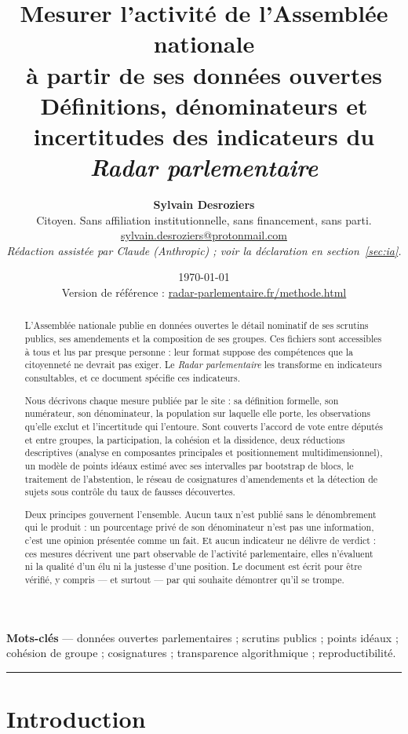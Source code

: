 \documentclass[11pt,a4paper]{article}
\title{\vspace{-1.2cm}
Mesurer l'activité de l'Assemblée nationale\\à partir de ses données ouvertes\\[0.35em]
\large Définitions, dénominateurs et incertitudes des indicateurs du
\emph{Radar parlementaire}}
\author{%
  \normalsize\textbf{Sylvain Desroziers}\\[0.15em]
  \small Citoyen. Sans affiliation institutionnelle, sans financement, sans parti.\\
  \small\href{mailto:sylvain.desroziers@protonmail.com}
             {sylvain.desroziers@protonmail.com}\\[0.5em]
  \small\itshape Rédaction assistée par Claude (Anthropic) ;
  voir la déclaration en section~\ref{sec:ia}.
}
\date{\small\today\\[0.3em]
  \small Version de référence : \href{https://radar-parlementaire.fr/methode.html}
                                     {radar-parlementaire.fr/methode.html}}
\begin{document}
\maketitle
\thispagestyle{plain}

\begin{abstract}
\noindent
L'Assemblée nationale publie en données ouvertes le détail nominatif de ses
scrutins publics, ses amendements et la composition de ses groupes. Ces
fichiers sont accessibles à tous et lus par presque personne : leur format
suppose des compétences que la citoyenneté ne devrait pas exiger. Le
\emph{Radar parlementaire} les transforme en indicateurs consultables, et ce
document spécifie ces indicateurs.

Nous décrivons chaque mesure publiée par le site : sa définition formelle, son
numérateur, son dénominateur, la population sur laquelle elle porte, les
observations qu'elle exclut et l'incertitude qui l'entoure. Sont couverts
l'accord de vote entre députés et entre groupes, la participation, la cohésion
et la dissidence, deux réductions descriptives (analyse en composantes
principales et positionnement multidimensionnel), un modèle de points idéaux
estimé avec ses intervalles par bootstrap de blocs, le traitement de
l'abstention, le réseau de cosignatures d'amendements et la détection de
sujets sous contrôle du taux de fausses découvertes.

Deux principes gouvernent l'ensemble. Aucun taux n'est publié sans le
dénombrement qui le produit : un pourcentage privé de son dénominateur n'est
pas une information, c'est une opinion présentée comme un fait. Et aucun
indicateur ne délivre de verdict : ces mesures décrivent une part observable
de l'activité parlementaire, elles n'évaluent ni la qualité d'un élu ni la
justesse d'une position. Le document est écrit pour être vérifié, y compris —
et surtout — par qui souhaite démontrer qu'il se trompe.
\end{abstract}

\vspace{0.4em}
\noindent\small\textbf{Mots-clés} — données ouvertes parlementaires ; scrutins
publics ; points idéaux ; cohésion de groupe ; cosignatures ; transparence
algorithmique ; reproductibilité.
\normalsize

\vspace{0.6em}
\hrule
\vspace{0.4em}

\tableofcontents
\newpage

\section{Introduction}
\end{document}
